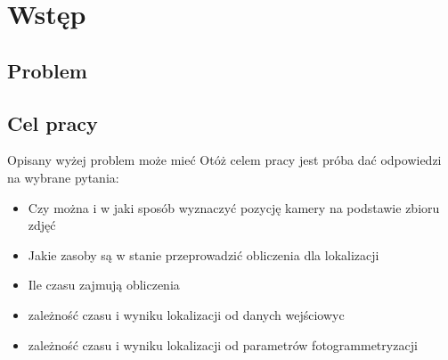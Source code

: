 
\graphicspath{ {./img/1_Intro/} }

\chapter{Wstęp}

\section{Problem}

\section{Cel pracy}
Opisany wyżej problem może mieć
Otóż celem pracy jest próba dać odpowiedzi na wybrane pytania:
\begin{itemize}
   \item Czy można i w jaki sposób wyznaczyć pozycję kamery na podstawie zbioru zdjęć
   \item Jakie zasoby są w stanie przeprowadzić obliczenia dla lokalizacji
   \item Ile czasu zajmują obliczenia
   \item zależność czasu i wyniku lokalizacji od danych wejściowyc
   \item zależność czasu i wyniku lokalizacji od parametrów fotogrammetryzacji
\end{itemize}
